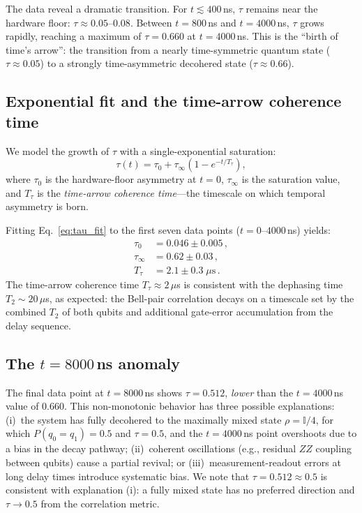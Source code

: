 \documentclass[prl,twocolumn,superscriptaddress,longbibliography,floatfix]{revtex4-2}
\newcommand{\tauasym}{\tau}
\begin{document}
The data reveal a dramatic transition.  For $t \lesssim 400\,$ns,
$\tauasym$ remains near the hardware floor:
$\tauasym \approx 0.05$--$0.08$.  Between $t = 800\,$ns and
$t = 4000\,$ns, $\tauasym$ grows rapidly, reaching a maximum of
$\tauasym = 0.660$ at $t = 4000\,$ns.  This is the ``birth of
time's arrow'': the transition from a nearly time-symmetric quantum
state ($\tauasym \approx 0.05$) to a strongly time-asymmetric
decohered state ($\tauasym \approx 0.66$).

\subsection{Exponential fit and the time-arrow coherence time}

We model the growth of $\tauasym$ with a single-exponential
saturation:
\begin{equation}\label{eq:tau_fit}
  \tauasym(t) = \tauasym_0 + \tauasym_\infty
    \left(1 - e^{-t/T_{\tauasym}}\right),
\end{equation}
where $\tauasym_0$ is the hardware-floor asymmetry at $t=0$,
$\tauasym_\infty$ is the saturation value, and $T_{\tauasym}$ is the
\emph{time-arrow coherence time}---the timescale on which temporal
asymmetry is born.

Fitting Eq.~\eqref{eq:tau_fit} to the first seven data points
($t = 0$--$4000\,$ns) yields:
\begin{align}
  \tauasym_0 &= 0.046 \pm 0.005\,, \nonumber\\
  \tauasym_\infty &= 0.62 \pm 0.03\,, \nonumber\\
  T_{\tauasym} &= 2.1 \pm 0.3\;\mu\text{s}\,.
  \label{eq:fit_params}
\end{align}
The time-arrow coherence time $T_\tauasym \approx 2\,\mu$s is
consistent with the dephasing time $T_2 \sim 20\,\mu$s, as
expected: the Bell-pair correlation decays on a timescale set by
the combined $T_2$ of both qubits and additional gate-error
accumulation from the delay sequence.

\subsection{The $t = 8000\,$ns anomaly}

The final data point at $t = 8000\,$ns shows
$\tauasym = 0.512$, \emph{lower} than the $t = 4000\,$ns value
of 0.660.  This non-monotonic behavior has three possible
explanations: (i)~the system has fully decohered to the maximally
mixed state $\rho = \mathbb{I}/4$, for which
$P(q_0{=}q_1) = 0.5$ and $\tauasym = 0.5$, and the $t=4000\,$ns
point overshoots due to a bias in the decay pathway; (ii)~coherent
oscillations (e.g., residual $ZZ$ coupling between qubits) cause a
partial revival; or (iii)~measurement-readout errors at long delay
times introduce systematic bias.  We note that
$\tauasym = 0.512 \approx 0.5$ is consistent with explanation (i):
a fully mixed state has no preferred direction and
$\tauasym \to 0.5$ from the correlation metric.
\end{document}
